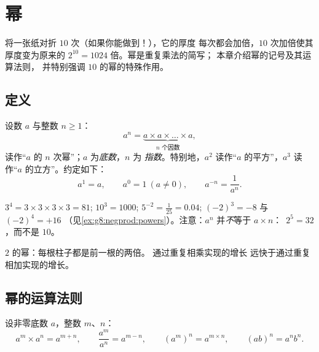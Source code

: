 \chapter{幂}\label{ch:g8:powers}

将一张纸对折 $10$ 次（如果你能做到！），它的厚度
每次都会加倍，$10$ 次加倍使其厚度变为原来的
$2^{10} = 1024$ 倍。幂是重复乘法的简写；
本章介绍幂的记号及其运算法则，
并特别强调 $10$ 的幂的特殊作用。

\section{定义}

\begin{definition}[幂]\label{def:g8:powers:def}
设数 $a$ 与整数 $n \geq 1$：
\[
a^n = \underbrace{a \times a \times \dots \times a}_{n
\text{ 个因数}},
\]
读作“$a$ 的 $n$ 次幂”；$a$ 为\emph{底数}，$n$ 为
\emph{指数}。特别地，$a^2$ 读作“$a$
的平方”，$a^3$ 读作“$a$ 的立方”。约定如下：
\[
a^1 = a,
\qquad
a^0 = 1 \ (a \neq 0),
\qquad
a^{-n} = \frac{1}{a^n}.
\]
\end{definition}

\begin{example}\label{ex:g8:powers:def}
$3^4 = 3 \times 3 \times 3 \times 3 = 81$; \quad
$10^3 = 1000$; \quad $5^{-2} = \frac{1}{25} = 0.04$; \quad
$(-2)^3 = -8$ 与 $(-2)^4 = +16$
（见\cref{ex:g8:negprod:powers}）。注意：$a^n$ 并\emph{不}等于
$a \times n$：\ $2^5 = 32$，而不是 $10$。
\end{example}

\begin{omfigure}

{\small $2$ 的幂：每根柱子都是前一根的两倍。
通过重复相乘实现的增长
远快于通过重复相加实现的增长。}
\end{omfigure}

\section{幂的运算法则}

\begin{theorem}[幂的运算法则]\label{thm:g8:powers:rules}
设非零底数 $a$，整数 $m$、$n$：
\[
a^m \times a^n = a^{m+n},
\qquad
\frac{a^m}{a^n} = a^{m-n},
\qquad
\left(a^m\right)^n = a^{m \times n},
\qquad
(ab)^n = a^n b^n .
\]
\end{theorem}

